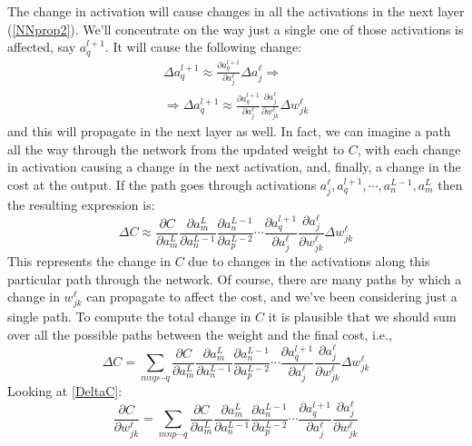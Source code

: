 The change in activation will cause changes in all the activations in the next layer (\autoref{NNprop2}). We'll concentrate on the way just a single one of those activations is affected, say $a^{l+1}_q$. It will cause the following change:
\begin{equation}
\begin{aligned}
\Delta a^{l+1}_q \approx \frac{\partial a_q^{l+1}}{\partial a_j^\ell}\Delta a_j^\ell \Rightarrow\\
\Rightarrow \Delta a^{l+1}_q \approx \frac{\partial a_q^{l+1}}{\partial a_j^\ell} \frac{\partial a_j^{\ell}}{\partial w_{jk}^\ell}\Delta w_{jk}^\ell
\end{aligned}
\end{equation}
and this will propagate in the next layer as well. 
In fact, we can imagine a path all the way through the network from the updated weight to $C$, with each  change in activation causing a change in the next activation, and, finally, a change in the cost at the output. If the 
path goes through activations $a^\ell_j,a^{l+1}_q,\cdots,a^{L-1}_n,a^L_m$ then the resulting expression is:
\begin{equation}
\Delta C \approx \frac{\partial C}{\partial a^L_m} \frac{\partial a^L_m}{\partial a^{L-1}_n}\frac{\partial a^{L-1}_n}{\partial a^{L-2}_p}\cdots \frac{\partial a^{l+1}_q}{\partial a^\ell_j}\frac{\partial a^\ell_j}{\partial w^{\ell}_{jk}}\Delta w^{\ell}_{jk}
\end{equation}
This represents the change in $C$ due to changes in the activations along this particular path through the network. Of course, there are many paths by which a change in $w^\ell_{jk}$ can propagate to affect the cost, and we've been considering just a single path. To compute the total change in $C$ it is plausible that we should sum over all the possible paths between the weight and the final cost, i.e.,
\begin{equation}
\Delta C =\sum_{mnp\cdots q} \frac{\partial C}{\partial a^L_m}\frac{\partial a^L_m}{\partial a^{L-1}_n}\frac{\partial a^{L-1}_n}{\partial a^{L-2}_p}\cdots \frac{\partial a^{l+1}_q}{\partial a^\ell_j}\frac{\partial a^\ell_j}{\partial w^{\ell}_{jk}}\Delta w^{\ell}_{jk}
\end{equation}
Looking at \autoref{DeltaC}:
\begin{equation}
\frac{\partial C}{\partial w_{jk}^\ell} =  \sum_{mnp\cdots q} \frac{\partial C}{\partial a^L_m}\frac{\partial a^L_m}{\partial a^{L-1}_n}\frac{\partial a^{L-1}_n}{\partial a^{L-2}_p}\cdots \frac{\partial a^{l+1}_q}{\partial a^\ell_j}\frac{\partial a^\ell_j}{\partial w^{\ell}_{jk}}
\end{equation}
